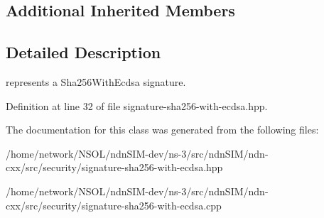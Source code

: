 \subsection*{Additional Inherited Members}


\subsection{Detailed Description}
represents a Sha256\+With\+Ecdsa signature. 

Definition at line 32 of file signature-\/sha256-\/with-\/ecdsa.\+hpp.



The documentation for this class was generated from the following files\+:\begin{DoxyCompactItemize}
\item 
/home/network/\+N\+S\+O\+L/ndn\+S\+I\+M-\/dev/ns-\/3/src/ndn\+S\+I\+M/ndn-\/cxx/src/security/signature-\/sha256-\/with-\/ecdsa.\+hpp\item 
/home/network/\+N\+S\+O\+L/ndn\+S\+I\+M-\/dev/ns-\/3/src/ndn\+S\+I\+M/ndn-\/cxx/src/security/signature-\/sha256-\/with-\/ecdsa.\+cpp\end{DoxyCompactItemize}

